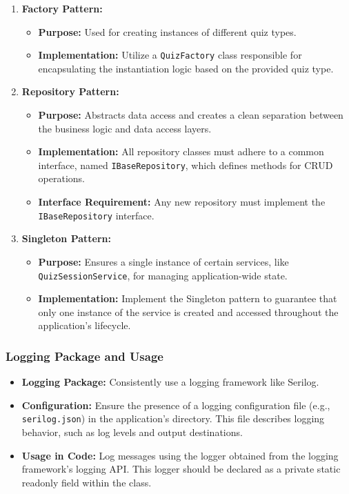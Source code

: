 \begin{enumerate}
  \item \textbf{Factory Pattern:}
        \begin{itemize}[label=$\bullet$]
          \item \textbf{Purpose:} Used for creating instances of different quiz types.
          \item \textbf{Implementation:} Utilize a \texttt{QuizFactory} class responsible for encapsulating the instantiation logic based on the provided quiz type.
        \end{itemize}

  \item \textbf{Repository Pattern:}
        \begin{itemize}[label=$\bullet$]
          \item \textbf{Purpose:} Abstracts data access and creates a clean separation between the business logic and data access layers.
          \item \textbf{Implementation:} All repository classes must adhere to a common interface, named \texttt{IBaseRepository}, which defines methods for CRUD operations.
          \item \textbf{Interface Requirement:} Any new repository must implement the \texttt{IBaseRepository} interface.
        \end{itemize}

  \item \textbf{Singleton Pattern:}
        \begin{itemize}[label=$\bullet$]
          \item \textbf{Purpose:} Ensures a single instance of certain services, like \texttt{QuizSessionService}, for managing application-wide state.
          \item \textbf{Implementation:} Implement the Singleton pattern to guarantee that only one instance of the service is created and accessed throughout the application's lifecycle.
        \end{itemize}

\end{enumerate}

\subsubsection{Logging Package and Usage}

\begin{itemize}[label=$\bullet$]
  \item \textbf{Logging Package:} Consistently use a logging framework like Serilog.
  \item \textbf{Configuration:} Ensure the presence of a logging configuration file (e.g., \texttt{serilog.json}) in the application's directory. This file describes logging behavior, such as log levels and output destinations.
  \item \textbf{Usage in Code:} Log messages using the logger obtained from the logging framework's logging API. This logger should be declared as a private static readonly field within the class.
\end{itemize}


